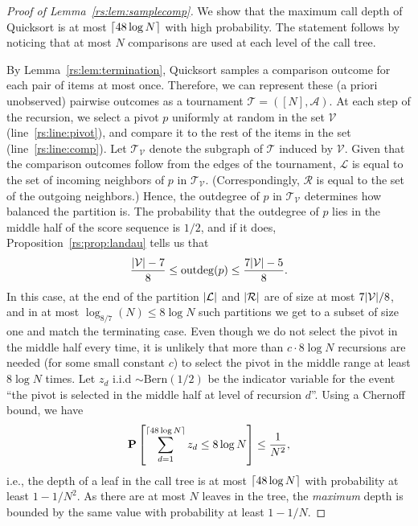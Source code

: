 \begin{proof}[Proof of Lemma~\ref{rs:lem:samplecomp}]
We show that the maximum call depth of Quicksort is at most $\lceil48 \log N\rceil$ with high probability.
The statement follows by noticing that at most $N$ comparisons are used at each level of the call tree.

By Lemma~\ref{rs:lem:termination}, Quicksort samples a comparison outcome for each pair of items at most once.
Therefore, we can represent these (a priori unobserved) pairwise outcomes as a tournament $\mathcal{T} = ([N], \mathcal{A})$.
At each step of the recursion, we select a pivot $p$ uniformly at random in the set $\mathcal{V}$ (line~\ref{rs:line:pivot}), and compare it to the rest of the items in the set (line~\ref{rs:line:comp}).
Let $\mathcal{T}_{\mathcal{V}}$ denote the subgraph of $\mathcal{T}$ induced by $\mathcal{V}$.
Given that the comparison outcomes follow from the edges of the tournament, $\mathcal{L}$ is equal to the set of incoming neighbors of $p$ in $\mathcal{T}_{\mathcal{V}}$.
(Correspondingly, $\mathcal{R}$ is equal to the set of the outgoing neighbors.)
Hence, the outdegree of $p$ in $\mathcal{T}_\mathcal{V}$ determines how balanced the partition is.
The probability that the outdegree of $p$ lies in the middle half of the score sequence is $1/2$, and if it does, Proposition~\ref{rs:prop:landau} tells us that
\begin{align*}
\frac{\lvert\mathcal{V}\rvert - 7}{8} \le \mathrm{outdeg}(p) \le \frac{7 \lvert\mathcal{V}\rvert - 5}{8}.
\end{align*}
In this case, at the end of the partition $\lvert\mathcal{L}\rvert$ and $\lvert\mathcal{R}\rvert$ are of size at most $7\lvert\mathcal{V}\rvert/8$, and in at most $\log_{8/7}(N) \le 8 \log N $ such partitions we get to a subset of size one and match the terminating case.
Even though we do not select the pivot in the middle half every time, it is unlikely that more than $c \cdot 8 \log N$ recursions are needed (for some small constant $c$) to select the pivot in the middle range at least $8 \log N$ times.
Let $z_d$ i.i.d $\sim \text{Bern}(1/2)$ be the indicator variable for the event ``the pivot is selected in the middle half at level of recursion $d$''.
Using a Chernoff bound, we have
\begin{align*}
\mathbf{P}\left[ \sum_{d=1}^{\lceil48 \log N\rceil} z_d \le 8 \log N \right] \le \frac{1}{N^2},
\end{align*}
i.e., the depth of a leaf in the call tree is at most $\lceil48 \log N\rceil$ with probability at least $1 - 1/N^2$.
As there are at most $N$ leaves in the tree, the \emph{maximum} depth is bounded by the same value with probability at least $1 - 1/N$.
\end{proof}

